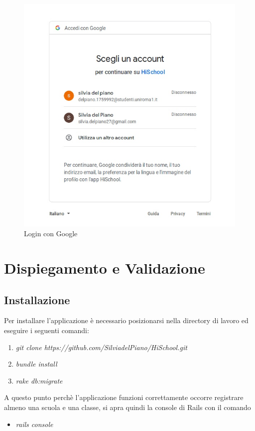 \documentclass[Lau, binding=0.6cm, oneside]{sapthesis}
\begin{document}
\begin{figure}[H]
	\centering
	\includegraphics[width=1\linewidth]{images/google_oauth} 
	\caption{Login con Google}
	\label{fig:google_oauth}
\end{figure}


\chapter{Dispiegamento e Validazione}

\section{Installazione}

Per installare l'applicazione è necessario posizionarsi nella directory di lavoro ed eseguire i seguenti comandi:
\begin{enumerate}
	\item \textit{git clone https://github.com/SilviadelPiano/HiSchool.git}
	\item \textit{bundle install}
	\item \textit{rake db:migrate}
\end{enumerate}

A questo punto perchè l'applicazione funzioni correttamente occorre registrare almeno una scuola e una classe, si apra quindi la console di Rails con il comando
\begin{itemize}
	\item \textit{rails console}
\end{itemize}
\end{document}
